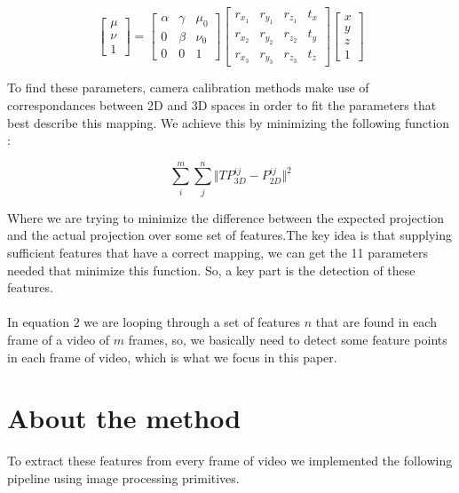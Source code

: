 \documentclass[journal]{IEEEtran}
\begin{document}
\begin{equation}
  \begin{bmatrix}
    \mu \\
    \nu \\
      1 
  \end{bmatrix} = 
  \begin{bmatrix}
    \alpha & \gamma & \mu_{0} \\
       0   & \beta  & \nu_{0} \\
       0   &    0   &    1
  \end{bmatrix} 
  \begin{bmatrix}
    r_{x_{1}} & r_{y_{1}} & r_{z_{1}} & t_{x}\\
    r_{x_{2}} & r_{y_{2}} & r_{z_{2}} & t_{y}\\
    r_{x_{3}} & r_{y_{3}} & r_{z_{3}} & t_{z}
  \end{bmatrix} 
  \begin{bmatrix}
    x \\
    y \\
    z \\
    1
  \end{bmatrix}
%
\end{equation}

To find these parameters, camera calibration methods make use of correspondances between 2D and 3D spaces in order to fit the parameters that best describe this mapping. We achieve this by minimizing the following function :

\begin{equation}
  \sum^{m}_{i} \sum^{n}_{j} \Vert TP^{ij}_{3D} - P^{ij}_{2D} \Vert^{2}
\end{equation}

Where we are trying to minimize the difference between the expected projection and the actual projection over some set of features.The key idea is that supplying sufficient features that have a correct mapping, we can get the 11 parameters needed that minimize this function. So, a key part is the detection of these features.
\\
\\
In equation $2$ we are looping through a set of features $n$ that are found in each frame of a video of $m$ frames, so, we basically need to detect some feature points in each frame of video, which is what we focus in this paper.

\section{About the method}
To extract these features from every frame of video we implemented the following pipeline using image processing primitives.
\end{document}
